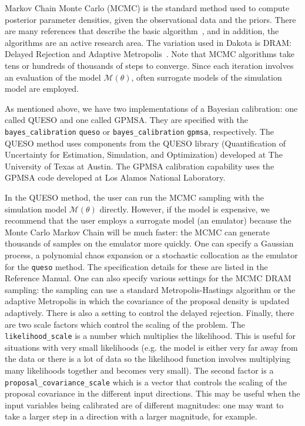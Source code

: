 Markov Chain Monte Carlo (MCMC) is the standard method used to compute 
posterior parameter densities, given the observational data 
and the priors. There are many references that 
describe the basic algorithm~\cite{Gilks}, and in addition, the algorithms 
are an active research area. The variation used in Dakota is DRAM: 
Delayed Rejection and Adaptive Metropolis~\cite{Haario}. Note that 
MCMC algorithms take tens or hundreds of thousands of steps to converge. 
Since each iteration involves an evaluation of the model 
$\mathcal{M}(\theta)$, often surrogate models of the simulation 
model are employed.
 
As mentioned above, we have two implementations of a Bayesian 
calibration:  one called QUESO and one called GPMSA. 
They are specified with the \texttt{bayes\_calibration} \texttt{queso}
or \texttt{bayes\_calibration} \texttt{gpmsa}, respectively.
The QUESO method uses components from the QUESO library
(Quantification of Uncertainty for Estimation, Simulation, and
Optimization) developed at The University of Texas at Austin.
The GPMSA calibration capability uses the GPMSA code developed at 
Los Alamos National Laboratory.

In the QUESO method, the user can run the MCMC sampling with 
the simulation model $\mathcal{M}(\theta)$ directly. However, 
if the model is expensive, we recommend that the user employs 
a surrogate model (an emulator) because the Monte Carlo Markov Chain 
will be much faster:  the MCMC can generate thousands of samples 
on the emulator more quickly. One can specify a Gaussian process,
a polynomial chaos expansion or a stochastic collocation 
as the emulator for the \texttt{queso} method. The specification 
details for these are listed in the Reference Manual. 
One can also specify various settings for the MCMC DRAM sampling: 
the sampling can use a standard Metropolis-Hastings algorithm 
or the adaptive Metropolis in which the covariance of the proposal 
density is updated adaptively. There is also a setting to control 
the delayed rejection. Finally, there are two scale factors 
which control the scaling of the problem. The 
\texttt{likelihood\_scale} is a number which multiplies the likelihood. 
This is useful for situations with very small likelihoods 
(e.g. the model is either very far away from the data or 
there is a lot of data so the likelihood function 
involves multiplying many likelihoods together and becomes very small).
The second factor is a \texttt{proposal\_covariance\_scale} 
which is a vector that controls the scaling of the proposal covariance
in the different input directions. This may be useful when the 
input variables being calibrated are of different magnitudes:  
one may want to take a larger step in a direction
with a larger magnitude, for example.
    
